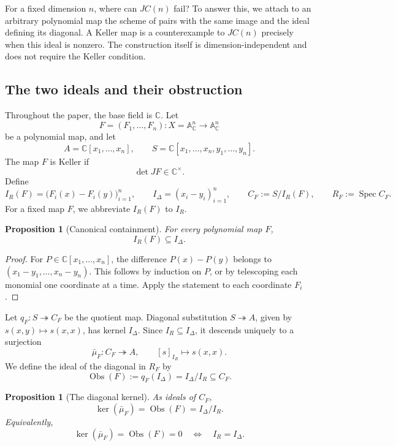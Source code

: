 \documentclass[11pt]{article}
\newtheorem{proposition}[theorem]{Proposition}
\theoremstyle{remark}
\DeclareMathOperator{\Spec}{Spec}
\newcommand{\A}{\mathbb A}
\newcommand{\C}{\mathbb C}
\newcommand{\Obs}{\operatorname{Obs}}
\begin{document}
For a fixed dimension \(n\), where can \(JC(n)\) fail?  To answer this, we
attach to an arbitrary polynomial map the scheme of pairs with the same image
and the ideal defining its diagonal.  A Keller map is a counterexample to
\(JC(n)\) precisely when this ideal is nonzero.  The construction itself is
dimension-independent and does not require the Keller condition.

\subsection{The two ideals and their obstruction}
\label{sec:collision-ideals}

Throughout the paper, the base field is \(\C\).  Let
\[
  F=(F_1,\dots,F_n)\colon
  X=\A^n_{\C}\longrightarrow\A^n_{\C}
\]
be a polynomial map, and let
\[
  A=\C[x_1,\dots,x_n],
  \qquad
  S=\C[x_1,\dots,x_n,y_1,\dots,y_n].
\]
The map \(F\) is Keller if
\[
  \det JF\in\C^\times.
\]
Define
\[
  I_R(F)=\bigl(F_i(x)-F_i(y)\bigr)_{i=1}^{n},
  \qquad
  I_\Delta=(x_i-y_i)_{i=1}^{n},
  \qquad
  C_F:=S/I_R(F),
  \qquad
  R_F:=\Spec C_F.
\]
For a fixed map \(F\), we abbreviate \(I_R(F)\) to \(I_R\).

\begin{proposition}[Canonical containment]
\label{prop:collision-contained-in-diagonal}
For every polynomial map \(F\),
\[
  I_R(F)\subseteq I_\Delta.
\]
\end{proposition}

\begin{proof}
For \(P\in\C[x_1,\dots,x_n]\), the difference \(P(x)-P(y)\) belongs to
\((x_1-y_1,\dots,x_n-y_n)\).  This follows by induction on \(P\), or by
telescoping each monomial one coordinate at a time.  Apply the statement
to each coordinate \(F_i\).
\end{proof}

Let \(q_F\colon S\twoheadrightarrow C_F\) be the quotient map.  Diagonal
substitution \(S\twoheadrightarrow A\), given by
\(s(x,y)\mapsto s(x,x)\), has kernel \(I_\Delta\).  Since
\(I_R\subseteq I_\Delta\), it descends uniquely to a surjection
\[
  \bar\mu_F\colon C_F\twoheadrightarrow A,
  \qquad
  [s]_{I_R}\longmapsto s(x,x).
\]
We define the ideal of the diagonal in \(R_F\) by
\[
  \Obs(F):=q_F(I_\Delta)=I_\Delta/I_R\subseteq C_F.
\]

\begin{proposition}[The diagonal kernel]
\label{prop:obstruction-kernel}
As ideals of \(C_F\),
\[
  \ker(\bar\mu_F)
  =
  \Obs(F)
  =
  I_\Delta/I_R.
\]
Equivalently,
\[
  \ker(\bar\mu_F)=\Obs(F)=0
  \quad\Longleftrightarrow\quad
  I_R=I_\Delta.
\]
\end{proposition}
\end{document}
